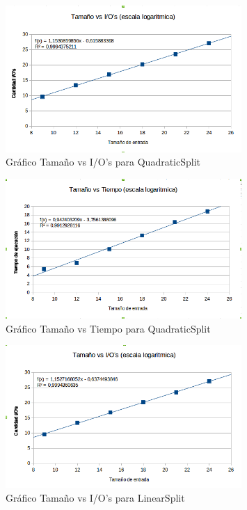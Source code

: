\documentclass[letterpaper,12pt]{article}
\begin{document}
\begin{figure}[bp!]
  \centering
    \includegraphics[width=0.8\textwidth]{quadratic_io}
  \caption{Gr\'afico Tama\~no vs I/O's para QuadraticSplit}
  \label{fig:f1}
\end{figure}

\begin{figure}[bp!]
  \centering
    \includegraphics[width=0.8\textwidth]{quadratic_tiempo}
  \caption{Gr\'afico Tama\~no vs Tiempo para QuadraticSplit}
  \label{fig:f2}
\end{figure}

\begin{figure}[bp!]
  \centering
    \includegraphics[width=0.8\textwidth]{linear_io}
  \caption{Gr\'afico Tama\~no vs I/O's para LinearSplit}
  \label{fig:f3}
\end{figure}
\end{document}
